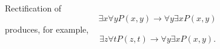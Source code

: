 

\setcounter{section}{1}
\setcounter{subsection}{2}
\setcounter{dfn}{6}

\begin{exl}
Rectification of
\[
\exists x \forall y P(x,y) \to \forall y \exists x P(x,y)
\]
produces, for example,
\[
\exists z \forall t P(z,t) \to \forall y \exists x P(x,y).
\]
\end{exl}


